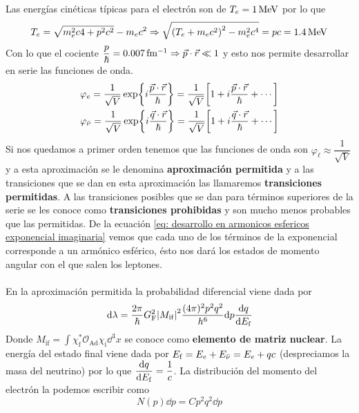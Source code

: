Las energías cinéticas típicas para el electrón son de $T_e=\unit[1]{MeV}$ por lo que $$T_e=\sqrt{m_e^2c4+p^2c^2}-m_ec^2 \Rightarrow \sqrt{\qty(T_e+m_ec^2)^2-m_e^2c^4}=pc= \unit[1.4]{MeV}$$ Con lo que el cociente $\dfrac{p}{\hbar}=\unit[0.007]{fm^{-1}} \Rightarrow \vec{p}\cdot \vec{r} \ll 1$ y esto nos permite desarrollar en serie las funciones de onda.
\newpage
\begin{equation*}
    \begin{aligned}
        &\varphi_e=\frac{1}{\sqrt{V}} \exp{i\frac{\vec{p}\cdot \vec{r}}{\hbar}}=\frac{1}{\sqrt{V}}\qty[1+i\frac{\vec{p}\cdot \vec{r}}{\hbar}+\cdots]\\
        &\varphi_{\Bar{\nu}}=\frac{1}{\sqrt{V}} \exp{i\frac{\vec{q}\cdot \vec{r}}{\hbar}}=\frac{1}{\sqrt{V}}\qty[1+i\frac{\vec{q}\cdot \vec{r}}{\hbar}+\cdots]
    \end{aligned}
\end{equation*}
Si nos quedamos a primer orden tenemos que las funciones de onda son $\varphi_\ell\approx \dfrac{1}{\sqrt{V}}$ y a esta aproximación se le denomina \textbf{aproximación permitida} y a las transiciones que se dan en esta aproximación las llamaremos \textbf{transiciones permitidas}. A las transiciones posibles que se dan para términos superiores de la serie se les conoce como \textbf{transiciones prohibidas} y son mucho menos probables que las permitidas.
De la ecuación \ref{eq: desarrollo en armonicos esfericos exponencial imaginaria} vemos que cada uno de los términos de la exponencial corresponde a un armónico esférico, ésto nos dará los estados de momento angular con el que salen los leptones.\\\\
En la aproximación permitida la probabilidad diferencial viene dada por 
\begin{equation*}
    \dd \lambda= \frac{2\pi }{\hbar} G_\mathrm{F}^2 \abs{M_\mathrm{if}}^2 \frac{(4\pi)^2 p^2 q^2}{h^6} \dd p \dv{q}{E_\mathrm{f}}
\end{equation*}
Donde $M_\mathrm{if}=\displaystyle \int \chi_\mathrm{f}^* \mathcal{O}_\mathrm{Ad} \chi_\mathrm{i} \dd^3x$ se conoce como \textbf{elemento de matriz nuclear}. La energía del estado final viene dada por $E_\mathrm{f}=E_e+E_{\Bar{\nu}}=E_e+qc$ (despreciamos la masa del neutrino) por lo que $\displaystyle \dv{q}
{E_\mathrm{f}}=\dfrac{1}{c}$. La distribución del momento del electrón la podemos escribir como
\begin{equation}
    N(p)\dd p=C p^2 q^2 \dd p
    \label{eq: densidad de estados electron desintegracion beta}
\end{equation}
